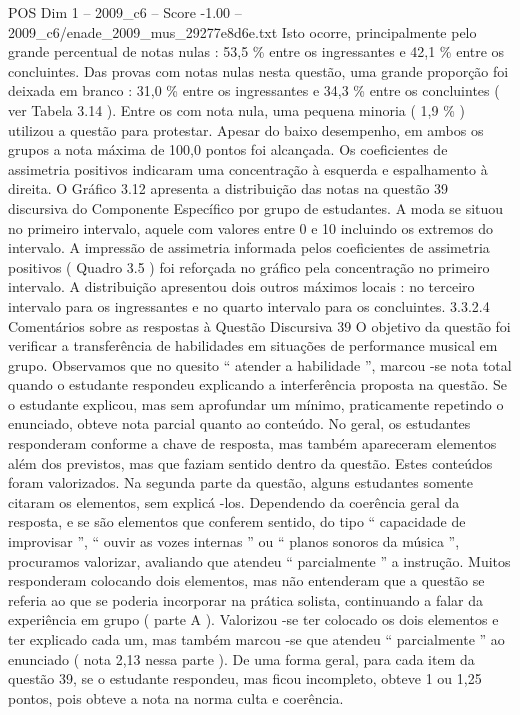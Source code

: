 \begin{textsample}{POS Dim 1 – 2009\_c6 – Score -1.00 – 2009\_c6/enade\_2009\_mus\_29277e8d6e.txt}
Isto ocorre, principalmente pelo grande percentual de notas nulas : 53,5 \% entre os ingressantes e 42,1 \% entre os concluintes.
Das provas com notas nulas nesta questão, uma grande proporção foi deixada em branco : 31,0 \% entre os ingressantes e 34,3 \% entre os concluintes ( ver Tabela 3.14 ).
Entre os com nota nula, uma pequena minoria ( 1,9 \% ) utilizou a questão para protestar.
Apesar do baixo desempenho, em ambos os grupos a nota máxima de 100,0 pontos foi alcançada.
Os coeficientes de assimetria positivos indicaram uma concentração à esquerda e espalhamento à direita.
O Gráfico 3.12 apresenta a distribuição das notas na questão 39 discursiva do Componente Específico por grupo de estudantes.
A moda se situou no primeiro intervalo, aquele com valores entre 0 e 10 incluindo os extremos do intervalo.
A impressão de assimetria informada pelos coeficientes de assimetria positivos ( Quadro 3.5 ) foi reforçada no gráfico pela concentração no primeiro intervalo.
A distribuição apresentou dois outros máximos locais : no terceiro intervalo para os ingressantes e no quarto intervalo para os concluintes. 3.3.2.4 Comentários sobre as respostas à Questão Discursiva 39 O objetivo da questão foi verificar a transferência de habilidades em situações de performance musical em grupo.
Observamos que no quesito “ atender a habilidade ”, marcou -se nota total quando o estudante respondeu explicando a interferência proposta na questão.
Se o estudante explicou, mas sem aprofundar um mínimo, praticamente repetindo o enunciado, obteve nota parcial quanto ao conteúdo.
No geral, os estudantes responderam conforme a chave de resposta, mas também apareceram elementos além dos previstos, mas que faziam sentido dentro da questão.
Estes conteúdos foram valorizados.
Na segunda parte da questão, alguns estudantes somente citaram os elementos, sem explicá -los.
Dependendo da coerência geral da resposta, e se são elementos que conferem sentido, do tipo “ capacidade de improvisar ”, “ ouvir as vozes internas ” ou “ planos sonoros da música ”, procuramos valorizar, avaliando que atendeu “ parcialmente ” a instrução.
Muitos responderam colocando dois elementos, mas não entenderam que a questão se referia ao que se poderia incorporar na prática solista, continuando a falar da experiência em grupo ( parte A ).
Valorizou -se ter colocado os dois elementos e ter explicado cada um, mas também marcou -se que atendeu “ parcialmente ” ao enunciado ( nota 2,13 nessa parte ).
De uma forma geral, para cada item da questão 39, se o estudante respondeu, mas ficou incompleto, obteve 1 ou 1,25 pontos, pois obteve a nota na norma culta e coerência.

\end{textsample}

